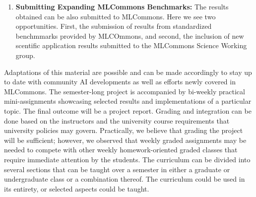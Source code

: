 \begin{enumerate}
\item{\bf Submitting Expanding MLCommons Benchmarks:} The results obtained can be also submitted to MLCommons. Here we see two opportunities. First, the submission of results from standardized benchmmarks provided by MLCOmmons, and second, the inclusion of new scentific application results submitted to the MLCommons Science Working group.
  
\end{enumerate}



Adaptations of this material are possible and can be made accordingly to stay up to date with community AI developments as well as efforts newly covered in MLCommons. The semester-long project is accompanied by bi-weekly practical mini-assignments showcasing selected results and implementations of a particular topic. The final outcome will be a project report. Grading and integration can be done based on the instructors and the university course requirements that university policies may govern. Practically, we believe that grading the project will be sufficient; however, we observed that weekly graded assignments may be needed to compete with other weekly homework-oriented graded classes that require immediate attention by the students.
The curriculum can be divided into several sections that can be taught over a semester in either a graduate or undergraduate class or a combination thereof. The curriculum could be used in its entirety, or selected aspects could be taught. 

